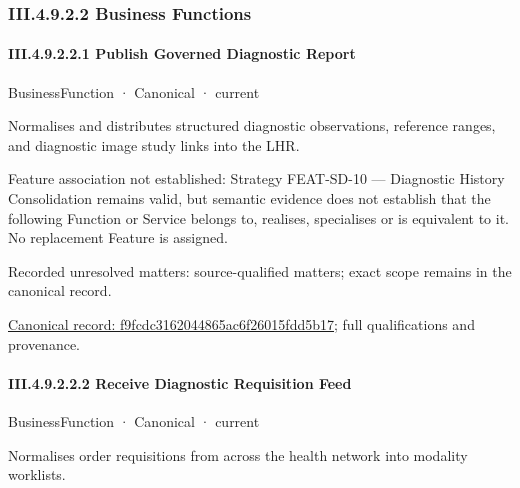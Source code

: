 \subsubsection*{III.4.9.2.2 Business Functions}
\label{navigation:III.4.9.2.2}

\paragraph*{III.4.9.2.2.1 Publish Governed Diagnostic Report}
\label{navigation:III.4.9.2.2.1}

\label{element:f9fcdc3162044865ac6f26015fdd5b17}
{\small BusinessFunction · Canonical · current}\par

Normalises and distributes structured diagnostic observations, reference ranges, and diagnostic image study links into the LHR.



Feature association not established: Strategy FEAT-SD-10 — Diagnostic History Consolidation remains valid, but semantic evidence does not establish that the following Function or Service belongs to, realises, specialises or is equivalent to it. No replacement Feature is assigned.


{\small Recorded unresolved matters: source-qualified matters; exact scope remains in the canonical record.}\par
{\footnotesize \href{../../../../../../../continuum/business/business-function/f9fcdc3162044865ac6f26015fdd5b17.md}{Canonical record: f9fcdc3162044865ac6f26015fdd5b17}; full qualifications and provenance.}\par
\paragraph*{III.4.9.2.2.2 Receive Diagnostic Requisition Feed}
\label{navigation:III.4.9.2.2.2}

\label{element:af3d47ada486425abc5ab5d054db7004}
{\small BusinessFunction · Canonical · current}\par

Normalises order requisitions from across the health network into modality worklists.



